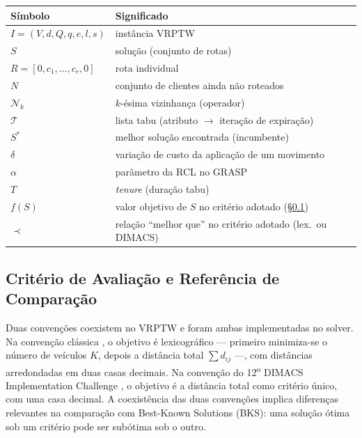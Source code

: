 \documentclass[10pt, a4paper]{article}
\begin{document}
\begin{quadro}[H]
\centering
\caption{Nota\c{c}\~ao utilizada nos pseudoc\'odigos}
\label{qdr-notacao}
\small
\begin{tabular}{|l|l|}
\hline
\rowcolor{gray!20}\textbf{S\'imbolo} & \textbf{Significado} \\
\hline
$I = (V, d, Q, q, e, l, s)$ & inst\^ancia VRPTW \\
$S$ & solu\c{c}\~ao (conjunto de rotas) \\
$R = [0, c_1, \ldots, c_r, 0]$ & rota individual \\
$N$ & conjunto de clientes ainda n\~ao roteados \\
$\mathcal{N}_k$ & $k$-\'esima vizinhan\c{c}a (operador) \\
$\mathcal{T}$ & lista tabu (atributo $\to$ itera\c{c}\~ao de expira\c{c}\~ao) \\
$S^*$ & melhor solu\c{c}\~ao encontrada (incumbente) \\
$\delta$ & varia\c{c}\~ao de custo da aplica\c{c}\~ao de um movimento \\
$\alpha$ & par\^ametro da RCL no GRASP \\
$T$ & \textit{tenure} (dura\c{c}\~ao tabu) \\
$f(S)$ & valor objetivo de $S$ no crit\'erio adotado (\S\ref{sec-criterios}) \\
$\prec$ & rela\c{c}\~ao ``melhor que'' no crit\'erio adotado (lex.\ ou DIMACS) \\
\hline
\end{tabular}
\end{quadro}

\subsection{Crit\'erio de Avalia\c{c}\~ao e Refer\^encia de Compara\c{c}\~ao}
\label{sec-criterios}

Duas conven\c{c}\~oes coexistem no VRPTW e foram ambas implementadas no solver. Na conven\c{c}\~ao cl\'assica \citep{solomon1987}, o objetivo \'e lexicogr\'afico --- primeiro minimiza-se o n\'umero de ve\'iculos $K$, depois a dist\^ancia total $\sum d_{ij}$ ---, com dist\^ancias arredondadas em duas casas decimais. Na conven\c{c}\~ao do 12\textsuperscript{o} DIMACS Implementation Challenge \citep{DIMACS2014}, o objetivo \'e a dist\^ancia total como crit\'erio \'unico, com uma casa decimal. A coexist\^encia das duas conven\c{c}\~oes implica diferen\c{c}as relevantes na compara\c{c}\~ao com Best-Known Solutions (BKS): uma solu\c{c}\~ao \'otima sob um crit\'erio pode ser sub\'otima sob o outro.
\end{document}

